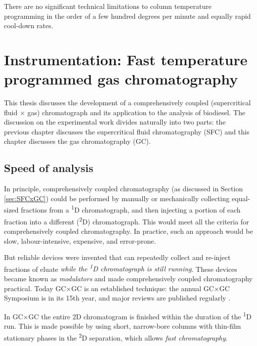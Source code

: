 
\begin{savequote}[60mm] There are no significant technical limitations to column
temperature programming in the order of a few hundred degrees per minute and
equally rapid cool-down rates.
\end{savequote}

\chapter{Instrumentation: Fast temperature programmed gas chromatography} %

\label{Chapter5} %

This thesis discusses the development of a comprehensively coupled
(supercritical fluid × gas) chromatograph and its application to the analysis of
biodiesel. The discussion on the experimental work divides naturally into two
parts: the previous chapter discusses the supercritical fluid chromatography
(SFC) and this chapter discusses the gas chromatography (GC).

\section{Speed of analysis}

In principle, comprehensively coupled chromatography (as discussed in Section
\ref{sec:SFCxGC}) could be performed by manually or mechanically collecting
equal-sized fractions from a \textsuperscript{1}D chromatograph, and then
injecting a portion of each fraction into a different (\textsuperscript{2}D)
chromatograph. This would meet all the criteria for comprehensively coupled
chromatography. In practice, such an approach would be slow, labour-intensive,
expensive, and error-prone.

But reliable devices were invented that can repeatedly collect and re-inject
fractions of eluate \textit{while the \textsuperscript{1}D chromatograph is
still running}. These devices became known as \textit{modulators} and made
comprehensively coupled chromatography practical. Today GC×GC is an established
technique: the annual GC×GC Symposium is in its 15th year, and major reviews are
published regularly \autocite{Seeley2013,Prebihalo2018}.

In GC×GC the entire 2D chromatogram is finished within the duration of the
\textsuperscript{1}D run. This is made possible by using short, narrow-bore
columns with thin-film stationary phases in the \textsuperscript{2}D separation,
which allows \textit{fast chromatography}.

